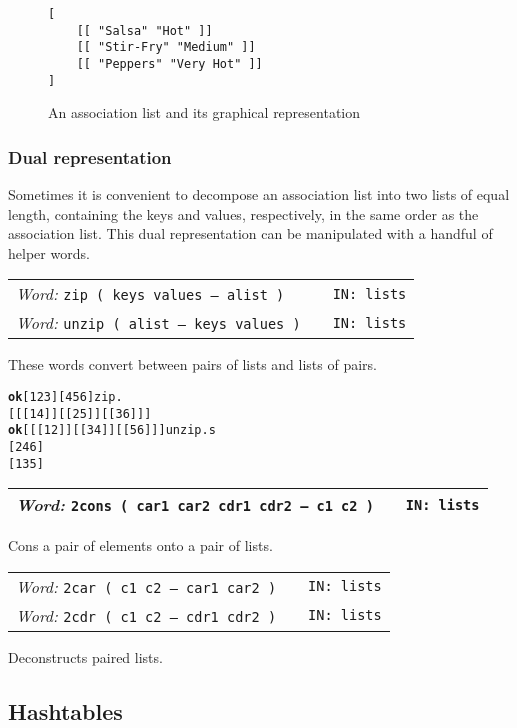 \documentclass{report}
\newcommand{\ordinaryword}[3]{\index{#1}
\emph{Word:} \texttt{#2} &&\texttt{IN: #3}}
\newcommand{\wordtable}[1]{

\begin{tabularx}{12cm}[t]{lXr}
\hline
#1\\
\hline
\end{tabularx}

}
\begin{document}
\begin{figure}
\caption{An association list and its graphical representation}
\begin{verbatim}
[
    [[ "Salsa" "Hot" ]]
    [[ "Stir-Fry" "Medium" ]]
    [[ "Peppers" "Very Hot" ]]
]
\end{verbatim}

\begin{center}
\end{center}
\end{figure}

\subsubsection{Dual representation}

Sometimes it is convenient to decompose an association list into two lists of equal length, containing the keys and values, respectively, in the same order as the association list. This dual representation can be manipulated with a handful of helper words.

\wordtable{
\ordinaryword{zip}{zip ( keys values -- alist )}{lists}\\
\ordinaryword{unzip}{unzip ( alist -- keys values )}{lists}
}
These words convert between pairs of lists and lists of pairs.
\begin{alltt}
\textbf{ok} [ 1 2 3 ] [ 4 5 6 ] zip .
[ [[ 1 4 ]] [[ 2 5 ]] [[ 3 6 ]] ]
\textbf{ok} [ [[ 1 2 ]] [[ 3 4 ]] [[ 5 6 ]] ] unzip .s
[ 2 4 6 ]
[ 1 3 5 ]
\end{alltt}
\wordtable{
\ordinaryword{2cons}{2cons ( car1 car2 cdr1 cdr2 -- c1 c2 )}{lists}
}
Cons a pair of elements onto a pair of lists.
\wordtable{
\ordinaryword{2car}{2car ( c1 c2 -- car1 car2 )}{lists}\\
\ordinaryword{2cdr}{2cdr ( c1 c2 -- cdr1 cdr2 )}{lists}
}
Deconstructs paired lists.

\subsection{Hashtables}
\end{document}
